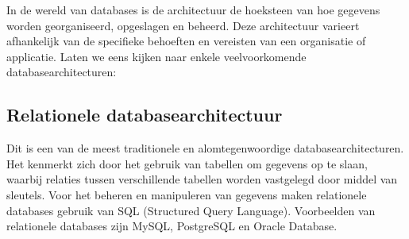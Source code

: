 In de wereld van databases is de architectuur de hoeksteen van hoe gegevens worden georganiseerd, opgeslagen en beheerd. Deze architectuur varieert afhankelijk van de specifieke behoeften en vereisten van een organisatie of applicatie. Laten we eens kijken naar enkele veelvoorkomende databasearchitecturen:

\subsection{Relationele databasearchitectuur}

Dit is een van de meest traditionele en alomtegenwoordige databasearchitecturen. Het kenmerkt zich door het gebruik van tabellen om gegevens op te slaan, waarbij relaties tussen verschillende tabellen worden vastgelegd door middel van sleutels. Voor het beheren en manipuleren van gegevens maken relationele databases gebruik van SQL (Structured Query Language). Voorbeelden van relationele databases zijn MySQL, PostgreSQL en Oracle Database.

\begin{table}[h]
    \centering
    \caption{Overzicht van de specificaties van MySQL \autocite{MySQLTechSpec}}
\end{table}

